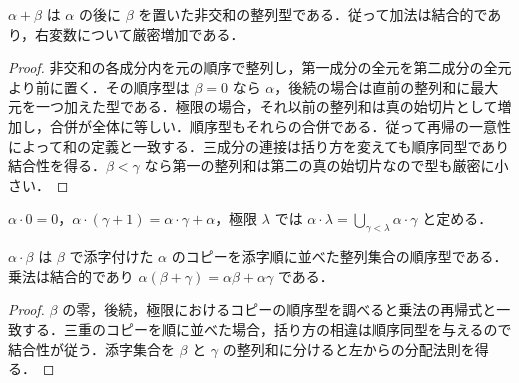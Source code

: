 \begin{prop}[順序数の加法と整列和]
$\alpha+\beta$ は $\alpha$ の後に $\beta$ を置いた非交和の整列型である．従って加法は結合的であり，右変数について厳密増加である．
\end{prop}
\begin{proof}
非交和の各成分内を元の順序で整列し，第一成分の全元を第二成分の全元より前に置く．その順序型は $\beta=0$ なら $\alpha$，後続の場合は直前の整列和に最大元を一つ加えた型である．極限の場合，それ以前の整列和は真の始切片として増加し，合併が全体に等しい．順序型もそれらの合併である．従って再帰の一意性によって和の定義と一致する．三成分の連接は括り方を変えても順序同型であり結合性を得る．$\beta<\gamma$ なら第一の整列和は第二の真の始切片なので型も厳密に小さい．
\end{proof}
\begin{defn}[順序数の乗法]
$\alpha\cdot0=0$，$\alpha\cdot(\gamma+1)=\alpha\cdot\gamma+\alpha$，極限 $\lambda$ では $\alpha\cdot\lambda=\bigcup_{\gamma<\lambda}\alpha\cdot\gamma$ と定める．
\end{defn}
\begin{prop}[順序数の乗法の整列型]
$\alpha\cdot\beta$ は $\beta$ で添字付けた $\alpha$ のコピーを添字順に並べた整列集合の順序型である．乗法は結合的であり $\alpha(\beta+\gamma)=\alpha\beta+\alpha\gamma$ である．
\end{prop}
\begin{proof}
$\beta$ の零，後続，極限におけるコピーの順序型を調べると乗法の再帰式と一致する．三重のコピーを順に並べた場合，括り方の相違は順序同型を与えるので結合性が従う．添字集合を $\beta$ と $\gamma$ の整列和に分けると左からの分配法則を得る．
\end{proof}
